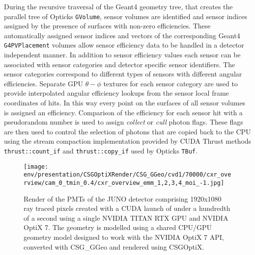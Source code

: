 \documentclass{webofc}
\begin{document}
During the recursive traversal of the Geant4 geometry tree, that creates the parallel tree of Opticks {\tt GVolume},
sensor volumes are identified and sensor indices assigned by the presence of surfaces with non-zero efficiencies. 
These automatically assigned sensor indices and vectors of the corresponding Geant4 {\tt G4PVPlacement} volumes 
allow sensor efficiency data to be handled in a detector independent manner. In addition to sensor efficiency values 
each sensor can be associated with sensor categories and detector specific sensor identifiers. The sensor categories
correspond to different types of sensors with different angular efficiencies.  Separate GPU $\theta-\phi$ textures 
for each sensor category are used to provide interpolated angular efficiency lookups from the sensor local 
frame coordinates of hits. In this way every point on the surfaces of all sensor volumes is assigned an efficiency.
Comparison of the efficiency for each sensor hit with a pseudorandom number is used to assign {\it collect} or {\it cull} 
photon flags. These flags are then used to control the selection of photons that are copied back to the CPU 
using the stream compaction implementation provided by CUDA Thrust\cite{thrust} methods {\tt thrust::count\_if} and 
{\tt thrust::copy\_if} used by Opticks {\tt TBuf}. 
%       
%
%
\begin{figure}
\centering
\texttt{[image: env/presentation/CSGOptiXRender/CSG\_GGeo/cvd1/70000/cxr\_overview/cam\_0\_tmin\_0.4/cxr\_overview\_emm\_1,2,3,4\_moi\_-1.jpg]}
\caption{Render of the PMTs of the JUNO detector comprising 1920x1080 ray traced pixels created with a CUDA launch of under a hundredth of a second  
using a single NVIDIA TITAN RTX GPU and NVIDIA OptiX 7.
The geometry is modelled using a shared CPU/GPU geometry model\cite{csgfoundry} 
designed to work with the NVIDIA OptiX 7 API, converted with CSG\_GGeo\cite{csgggeo} and rendered using CSGOptiX\cite{csgoptix}.
\label{j1808}}
\end{figure}
%
%
\end{document}
